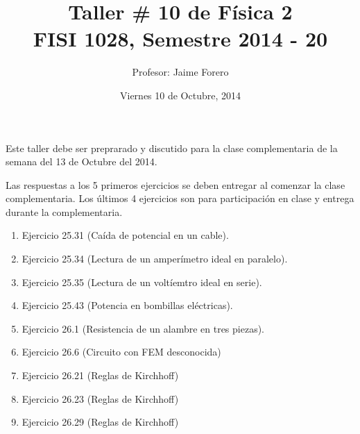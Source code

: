 \documentclass{article}
\title{Taller \# 10 de F\'isica 2\\ FISI 1028, Semestre 2014 - 20}
\author{Profesor: Jaime Forero}
\date{Viernes 10 de Octubre, 2014}
\begin{document}
\maketitle
\thispagestyle{empty}

\noindent

Este taller debe ser preprarado y discutido para la clase
complementaria de la semana del 13 de Octubre del 2014.


Las respuestas a los 5 primeros ejercicios se deben entregar al comenzar la
clase complementaria. Los \'ultimos 4 ejercicios son para
participaci\'on en clase y entrega durante la complementaria. 

\begin{enumerate}

\item
Ejercicio 25.31 (Ca\'ida de potencial en un cable).

\item 
Ejercicio 25.34 (Lectura de un amper\'imetro ideal en paralelo).

\item 
Ejercicio 25.35 (Lectura de un volt\'iemtro ideal en serie).

\item 
Ejercicio 25.43 (Potencia en bombillas el\'ectricas).

\item
Ejercicio 26.1 (Resistencia de un alambre en tres piezas).

\item 
Ejercicio 26.6 (Circuito con FEM desconocida)

\item
Ejercicio 26.21 (Reglas de Kirchhoff)

\item
Ejercicio 26.23 (Reglas de Kirchhoff)

\item
Ejercicio 26.29 (Reglas de Kirchhoff)



\end{enumerate}
\end{document}
